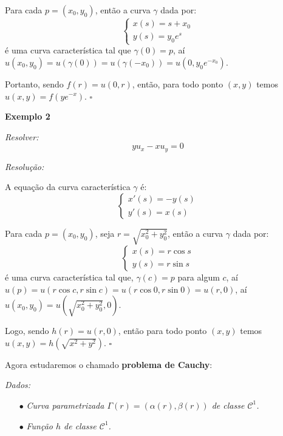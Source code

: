\documentclass[11pt,twoside,a4paper]{book}
\begin{document}
\smallskip
\noindent
Para cada $p=(x_0,y_0)$, então a curva $\gamma$ dada por:
\begin{equation*}
    \begin{cases}
    x(s)=s+x_0       \\
    y(s)=y_0e^{s}      
    \end{cases}
\end{equation*}
é uma curva característica tal que $\gamma(0)=p$, aí $u(x_0,y_0)=u(\gamma(0))=u(\gamma(-x_0))=u(0,y_0e^{-x_0})$.

\smallskip
\noindent
Portanto, sendo $f(r)=u(0,r)$, então, para todo ponto $(x,y)$ temos $u(x,y)=f(ye^{-x})$. $\square$

\bigskip
\noindent
\textbf{Exemplo 2}

\smallskip
\noindent
\textit{Resolver:}
\begin{equation*}
    yu_x-xu_y=0
\end{equation*}

\smallskip
\noindent
\textit{Resolução:}

\smallskip
\noindent
A equação da curva característica $\gamma$ é:
\begin{equation*}
    \begin{cases}
    x'(s)=-y(s)       \\
    y'(s)=x(s)     
    \end{cases}
\end{equation*}

\smallskip
\noindent
Para cada $p=(x_0,y_0)$, seja $r=\sqrt{x_0^2+y_0^2}$, então a curva $\gamma$ dada por:
\begin{equation*}
    \begin{cases}
    x(s)=r\cos s       \\
    y(s)=r\sin s      
    \end{cases}
\end{equation*}
é uma curva característica tal que, $\gamma(c)=p$ para algum $c$, aí $u(p)=u(r\cos c,r\sin c)=u(r\cos 0,r\sin 0)=u(r,0)$, aí $u(x_0,y_0)=u\left(\sqrt{x_0^2+y_0^2},0\right)$.

\medskip
\noindent
Logo, sendo $h(r)=u(r,0)$, então para todo ponto $(x,y)$ temos $u(x,y)=h\left(\sqrt{x^2+y^2}\right)$. $\square$

\bigskip
\noindent
Agora estudaremos o chamado \textbf{problema de Cauchy}:

\smallskip
\noindent
\textit{Dados:}
\begin{enumerate}
    \item[$\bullet$] \textit{Curva parametrizada $\Gamma(r)=(\alpha(r),\beta(r))$ de classe $\mathcal{C}^1$.}
    \item[$\bullet$] \textit{Função $h$ de classe $\mathcal{C}^1$.}
\end{enumerate}
\end{document}
